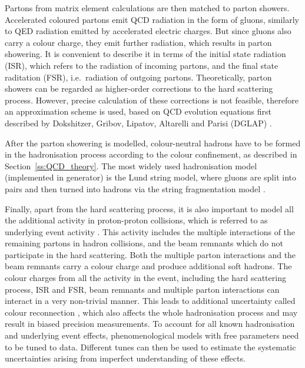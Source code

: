 Partons from matrix element calculations are then matched to parton showers. Accelerated coloured partons emit QCD
radiation in the form of gluons, similarly to QED radiation emitted by accelerated electric charges. But since gluons
also carry a colour charge, they emit further radiation, which results in parton showering. It is convenient to describe
it in terms of the initial state radiation (ISR), which refers to the radiation of incoming partons, and the final state
raditation (FSR), i.e.\ radiation of outgoing partons. Theoretically, parton showers can be regarded as higher-order
corrections to the hard scattering process. However, precise calculation of these corrections is not feasible, therefore
an approximation scheme is used, based on QCD evolution equations first described by Dokshitzer, Gribov, Lipatov,
Altarelli and Parisi (DGLAP) \autocite{Dokshitzer, Gribov_Lipatov, Altarelli_Parisi}.

After the parton showering is modelled, colour-neutral hadrons have to be formed in the hadronisation process according
to the colour confinement, as described in Section~\ref{ss:QCD_theory}. The most widely used hadronisation model
(implemented in \PYTHIA generator) is the Lund string model, where gluons are split into \qqbar pairs and then turned
into hadrons via the string fragmentation model \autocite{Lund_model}.


Finally, apart from the hard scattering process, it is also important to model all the additional activity in
proton-proton collisions, which is referred to as underlying event activity \autocite{underlying_event}. This activity
includes the multiple interactions of the remaining partons in hadron collisions, and the beam remnants which do not
participate in the hard scattering. Both the multiple parton interactions and the beam remnants carry a colour charge
and produce additional soft hadrons. The colour charges from all the activity in the event, including the hard
scattering process, ISR and FSR, beam remnants and multiple parton interactions can interact in a very non-trivial
manner. This leads to additional uncertainty called colour reconnection \autocite{colour_reconnection}, which also
affects the whole hadronisation process and may result in biased precision measurements. To account for all known
hadronisation and underlying event effects, phenomenological models with free parameters need to be tuned to data.
Different tunes can then be used to estimate the systematic uncertainties arising from imperfect understanding of these
effects.

